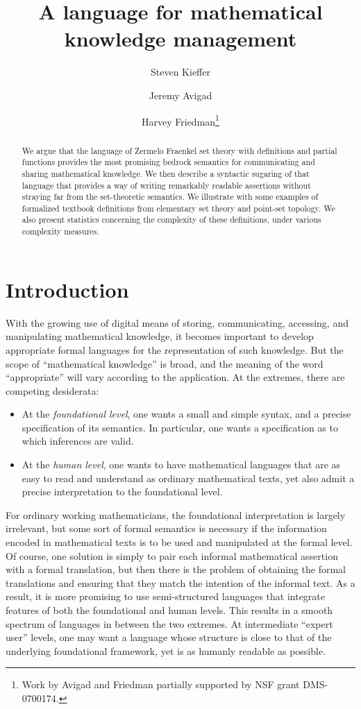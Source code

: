 \documentclass{llncs}
\title{A language for mathematical\\ knowledge management}
\author{Steven Kieffer\inst{1} \and Jeremy Avigad \inst{2} \and 
  Harvey Friedman\inst{3}\thanks{Work by Avigad and Friedman partially
  supported by NSF grant DMS-0700174.}}
\institute{Simon Fraser University \and Carnegie Mellon University \and 
  Ohio State University}
\begin{document}
\maketitle

\begin{abstract}
  We argue that the language of Zermelo Fraenkel set theory with
  definitions and partial functions provides the most promising
  bedrock semantics for communicating and sharing mathematical
  knowledge. We then describe a syntactic sugaring of that language
  that provides a way of writing remarkably readable assertions
  without straying far from the set-theoretic semantics. We illustrate
  with some examples of formalized textbook definitions from
  elementary set theory and point-set topology. We also present
  statistics concerning the complexity of these definitions, under
  various complexity measures.
\end{abstract}

\section{Introduction}

With the growing use of digital means of storing, communicating,
accessing, and manipulating mathematical knowledge, it becomes
important to develop appropriate formal languages for the
representation of such knowledge. But the scope of
``mathematical knowledge'' is broad, and the meaning of the word
``appropriate'' will vary according to the application. At the
extremes, there are competing desiderata:
\begin{itemize}
\item At the \emph{foundational level}, one wants a small and simple
  syntax, and a precise specification of its semantics. In particular,
  one wants a specification as to which inferences are valid.
\item At the \emph{human level}, one wants to have mathematical
  languages that are as easy to read and understand as ordinary
  mathematical texts, yet also admit a precise interpretation to the
  foundational level.
\end{itemize}
For ordinary working mathematicians, the foundational interpretation
is largely irrelevant, but some sort of formal semantics is necessary
if the information encoded in mathematical texts is to be used and
manipulated at the formal level. Of course, one solution is simply to
pair each informal mathematical assertion with a formal translation,
but then there is the problem of obtaining the formal translations and
ensuring that they match the intention of the informal text. As a
result, it is more promising to use semi-structured languages that
integrate features of both the foundational and human levels.  This
results in a smooth spectrum of languages in between the two extremes.
At intermediate ``expert user'' levels, one may want a language whose
structure is close to that of the underlying foundational framework,
yet is as humanly readable as possible.
\end{document}
